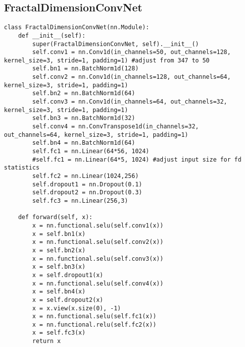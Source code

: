 \begin{appendices}
\chapter{FractalDimensionConvNet}
\label{appendix3}
\begin{verbatim}
class FractalDimensionConvNet(nn.Module):
    def __init__(self):
        super(FractalDimensionConvNet, self).__init__()
        self.conv1 = nn.Conv1d(in_channels=50, out_channels=128, kernel_size=3, stride=1, padding=1) #adjust from 347 to 50
        self.bn1 = nn.BatchNorm1d(128)
        self.conv2 = nn.Conv1d(in_channels=128, out_channels=64, kernel_size=3, stride=1, padding=1)
        self.bn2 = nn.BatchNorm1d(64)
        self.conv3 = nn.Conv1d(in_channels=64, out_channels=32, kernel_size=3, stride=1, padding=1)
        self.bn3 = nn.BatchNorm1d(32)
        self.conv4 = nn.ConvTranspose1d(in_channels=32, out_channels=64, kernel_size=3, stride=1, padding=1)
        self.bn4 = nn.BatchNorm1d(64)
        self.fc1 = nn.Linear(64*56, 1024)
        #self.fc1 = nn.Linear(64*5, 1024) #adjust input size for fd statistics
        self.fc2 = nn.Linear(1024,256)
        self.dropout1 = nn.Dropout(0.1)
        self.dropout2 = nn.Dropout(0.3)
        self.fc3 = nn.Linear(256,3)

    def forward(self, x):
        x = nn.functional.selu(self.conv1(x))
        x = self.bn1(x)
        x = nn.functional.selu(self.conv2(x))
        x = self.bn2(x)
        x = nn.functional.selu(self.conv3(x))
        x = self.bn3(x)
        x = self.dropout1(x)
        x = nn.functional.selu(self.conv4(x))
        x = self.bn4(x)
        x = self.dropout2(x)
        x = x.view(x.size(0), -1)
        x = nn.functional.selu(self.fc1(x))
        x = nn.functional.relu(self.fc2(x))
        x = self.fc3(x)
        return x
\end{verbatim}
\end{appendices}